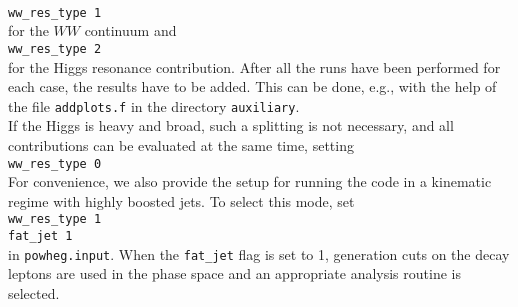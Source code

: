 \documentclass[a4paper,11pt]{article}
\begin{document}
\\[2ex]
{\tt ww\_res\_type 1}
\\[2ex]
for the $WW$ continuum and
\\[2ex]
{\tt ww\_res\_type 2}
\\[2ex]
for the Higgs resonance contribution. After all the runs have been
performed for each case, the results have to be added. This can be
done, e.g., with the help of the file {\tt addplots.f} in the
directory {\tt auxiliary}. 
\\[2ex]
If the Higgs is heavy and broad, such a splitting is not necessary,
and all contributions can be evaluated at the same time, setting
\\[2ex]
{\tt ww\_res\_type 0}
\\[2ex]
%
For convenience, we also provide the setup for running the code in a kinematic regime with highly boosted jets. To select this mode, set 
\\[2ex]
{\tt ww\_res\_type 1}
\\
{\tt fat\_jet 1}
\\[2ex]
in {\tt powheg.input}. When the {\tt fat\_jet} flag is set to 1, generation cuts on the decay leptons are used in the 
phase space and an appropriate analysis routine is selected. 
\end{document}
